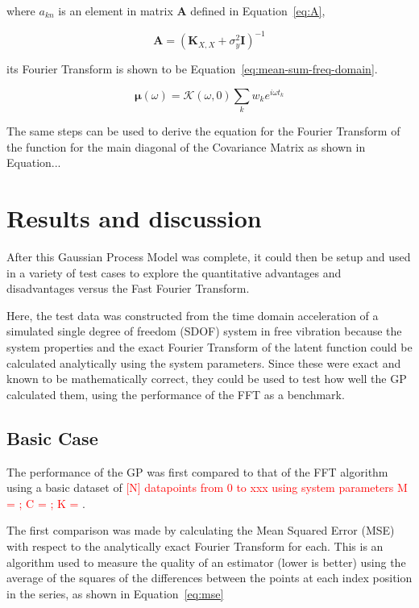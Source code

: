 \documentclass[12pt]{article}
\begin{document}
    \noindent where $a_{kn}$ is an element in matrix $\mathbf{A}$ defined in Equation~\ref{eq:A},

    \begin{equation}
         \mathbf{A} = (\mathbf{K}_{X,X} + \sigma^2_y \mathbf{I})^{-1} \label{eq:A}
    \end{equation}

    \noindent its Fourier Transform is shown to be Equation~\ref{eq:mean-sum-freq-domain}.

    \begin{equation}
        \mathbf{\mu}(\omega) = \mathcal{K}(\omega,0) \sum_k w_k e^{i \omega t_k} \label{eq:mean-sum-freq-domain}
    \end{equation}

    The same steps can be used to derive the equation for the Fourier Transform of the function for the main diagonal of the Covariance Matrix as shown in Equation...

    \section{Results and discussion}
    After this Gaussian Process Model was complete, it could then be setup and used in a variety of test cases to explore the quantitative advantages and disadvantages versus the Fast Fourier Transform.

    Here, the test data was constructed from the time domain acceleration of a simulated single degree of freedom (SDOF) system in free vibration because the system properties and the exact Fourier Transform of the latent function could be calculated analytically using the system parameters.
    Since these were exact and known to be mathematically correct, they could be used to test how well the GP calculated them, using the performance of the FFT as a benchmark.

    \subsection{Basic Case}
    The performance of the GP was first compared to that of the FFT algorithm using a basic dataset of \textcolor{red}{[N] datapoints from 0 to xxx using system parameters M = ; C = ; K = }.

    The first comparison was made by calculating the Mean Squared Error (MSE) with respect to the analytically exact Fourier Transform for each.
    This is an algorithm used to measure the quality of an estimator (lower is better) using the average of the squares of the differences between the points at each index position in the series, as shown in Equation~\ref{eq:mse}
\end{document}
